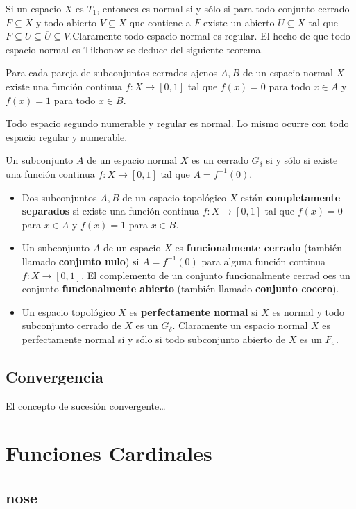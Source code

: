 \documentclass[12pt]{report}
\theoremstyle{largebreak}
\newcommand{\cf}[3]{\ensuremath{#1:#2\rightarrow#3}}
\begin{document}
    \begin{obs}
        Si un espacio $X$ es $T_1$, entonces es normal si y sólo si para todo conjunto cerrado $F\subseteq X$ y todo abierto $V\subseteq X$ que contiene a $F$ existe un abierto $U\subseteq X$ tal que $F\subseteq U\subseteq \overline{U}\subseteq V$.Claramente todo espacio normal es regular. El hecho de que todo espacio normal es Tikhonov se deduce del siguiente teorema.
    \end{obs}

    \begin{theor}
        Para cada pareja de subconjuntos cerrados ajenos $A,B$ de un espacio normal $X$ existe una función continua $\cf{f}{X}{[0,1]}$ tal que $f(x)=0$ para todo $x\in A$ y $f(x)=1$ para todo $x\in B$.
    \end{theor}
    
    \begin{obs}
        Todo espacio segundo numerable y regular es normal. Lo mismo ocurre con todo espacio regular y numerable.
    \end{obs}

    \begin{cor}
        Un subconjunto $A$ de un espacio normal $X$ es un cerrado $G_\delta$ si y sólo si existe una función continua $\cf{f}{X}{[0,1]}$ tal que $A=f^{-1}(0)$.
    \end{cor}

    \begin{mydef}
        \begin{itemize}
            \item Dos subconjuntos $A,B$ de un espacio topológico $X$ están \textbf{completamente separados} si existe una función continua $\cf{f}{X}{[0,1]}$ tal que $f(x)=0$ para $x\in A$ y $f(x)=1$ para $x\in B$.
            \item Un subconjunto $A$ de un espacio $X$ es \textbf{funcionalmente cerrado} (también llamado \textbf{conjunto nulo}) si $A=f^{-1}(0)$ para alguna función continua $\cf{f}{X}{[0,1]}$. El complemento de un conjunto funcionalmente cerrad oes un conjunto \textbf{funcionalmente abierto} (también llamado \textbf{conjunto cocero}).
            \item Un espacio topológico $X$ es \textbf{perfectamente normal} si $X$ es normal y todo subconjunto cerrado de $X$ es un $G_\delta$. Claramente un espacio normal $X$ es perfectamente normal si y sólo si todo subconjunto abierto de $X$ es un $F_\sigma$.
        \end{itemize}
    \end{mydef}

    \section{Convergencia}

    El concepto de sucesión convergente\dots


    \chapter{Funciones Cardinales}

    \section{nose}
\end{document}
